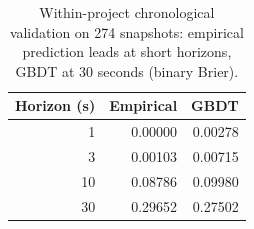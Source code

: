 \begin{table}[t]
\centering\small
\caption{Within-project chronological validation on 274 snapshots: empirical prediction leads at short horizons, GBDT at 30 seconds (binary Brier).}
\label{tab:continuous-prediction}
\begin{tabular}{@{}rrr@{}}
\toprule
Horizon (s) & Empirical & GBDT \\
\midrule
1 & 0.00000 & 0.00278 \\
3 & 0.00103 & 0.00715 \\
10 & 0.08786 & 0.09980 \\
30 & 0.29652 & 0.27502 \\
\bottomrule
\end{tabular}
\end{table}
